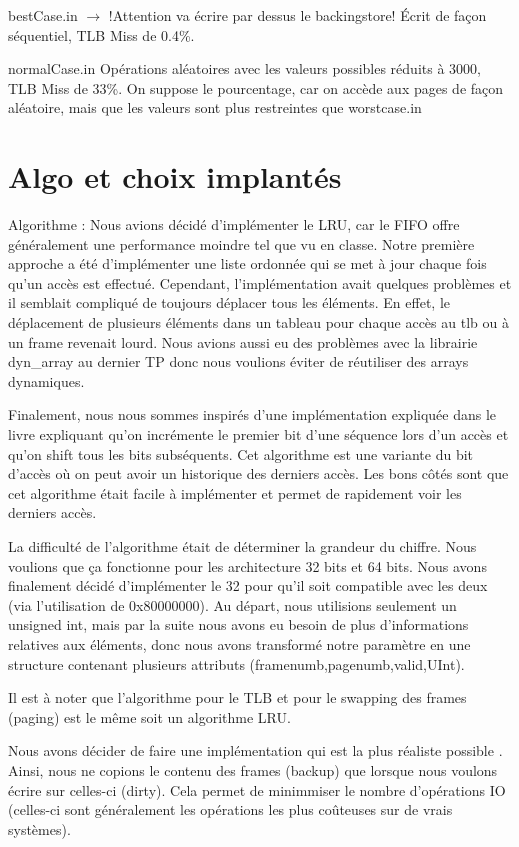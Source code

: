 \documentclass{article}
\begin{document}
bestCase.in $\rightarrow $ !Attention va écrire par dessus le backingstore!
Écrit de façon séquentiel, TLB Miss de 0.4\%.

normalCase.in
Opérations aléatoires avec les valeurs possibles réduits à 3000, TLB Miss de 33\%. On suppose le pourcentage, car on accède aux pages de façon aléatoire, mais que les valeurs sont plus restreintes que worstcase.in

\section{Algo et choix implantés}
\par
Algorithme : Nous avions décidé d’implémenter le LRU, car le FIFO offre généralement une performance moindre tel que vu en classe. Notre première approche a été d’implémenter une liste ordonnée qui se met à jour chaque fois qu’un accès est effectué. Cependant, l’implémentation avait quelques problèmes et il semblait compliqué de toujours déplacer tous les éléments. En effet, le déplacement de plusieurs éléments dans un tableau pour chaque accès au tlb ou à un frame revenait lourd. Nous avions aussi eu des problèmes avec la librairie dyn\_array au dernier TP donc nous voulions éviter de réutiliser des arrays dynamiques. 

Finalement, nous nous sommes inspirés d’une implémentation expliquée dans le livre expliquant qu’on incrémente le premier bit d’une séquence lors d’un accès et qu’on shift tous les bits subséquents. Cet algorithme est une variante du bit d’accès où on peut avoir un historique des derniers accès. Les bons côtés sont que cet algorithme était facile à implémenter et permet de rapidement voir les derniers accès. 

La difficulté de l’algorithme était de déterminer la grandeur du chiffre. Nous voulions que ça fonctionne pour les architecture 32 bits et 64 bits. Nous avons finalement décidé d’implémenter le 32 pour qu’il soit compatible avec les deux (via l’utilisation de 0x80000000). Au départ, nous utilisions seulement un unsigned int, mais par la suite nous avons eu besoin de plus d’informations relatives aux éléments, donc nous avons transformé notre paramètre en une structure contenant plusieurs attributs (framenumb,pagenumb,valid,UInt).

Il est à noter que l’algorithme pour le TLB et pour le swapping des frames (paging) est le même  soit un algorithme  LRU.

\par
Nous avons décider de faire une implémentation qui est la plus réaliste possible . Ainsi, nous ne copions le contenu des frames (backup) que lorsque nous voulons écrire sur celles-ci (dirty). Cela permet de minimmiser le nombre d’opérations IO (celles-ci sont généralement les opérations les plus coûteuses sur de vrais systèmes). 
\end{document}
